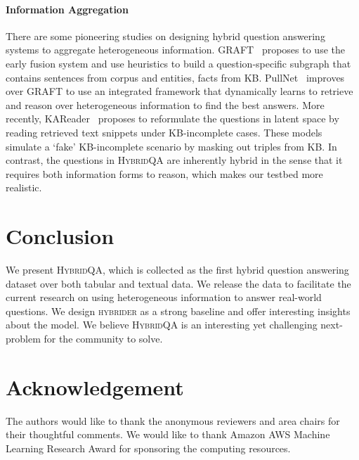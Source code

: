 \documentclass[11pt,a4paper]{article}
\newcommand{\dataset}{\textsc{HybridQA}\xspace}
\newcommand{\model}{\textsc{hybrider}\xspace}
\begin{document}
\paragraph{Information Aggregation} There are some pioneering studies on designing hybrid question answering systems to aggregate heterogeneous information.  GRAFT~\cite{sun2018open} proposes to use the early fusion system and use heuristics to build a question-specific subgraph that contains sentences from corpus and entities, facts from KB. PullNet~\cite{sun2019pullnet} improves over GRAFT to use an integrated framework that dynamically learns to retrieve and reason over heterogeneous information to find the best answers. More recently, KAReader~\cite{xiong2019improving} proposes to reformulate the questions in latent space by reading retrieved text snippets under KB-incomplete cases. These models simulate a `fake' KB-incomplete scenario by masking out triples from KB. In contrast, the questions in \dataset are inherently hybrid in the sense that it requires both information forms to reason, which makes our testbed more realistic.


\section{Conclusion}
We present \dataset, which is collected as the first hybrid question answering dataset over both tabular and textual data. We release the data to facilitate the current research on using heterogeneous information to answer real-world questions. We design \model as a strong baseline and offer interesting insights about the model. We believe \dataset is an interesting yet challenging next-problem for the community to solve.

\section*{Acknowledgement}
The authors would like to thank the anonymous reviewers and area chairs for their thoughtful comments. We would like to thank Amazon AWS Machine Learning Research Award for sponsoring the computing resources.



\end{document}
